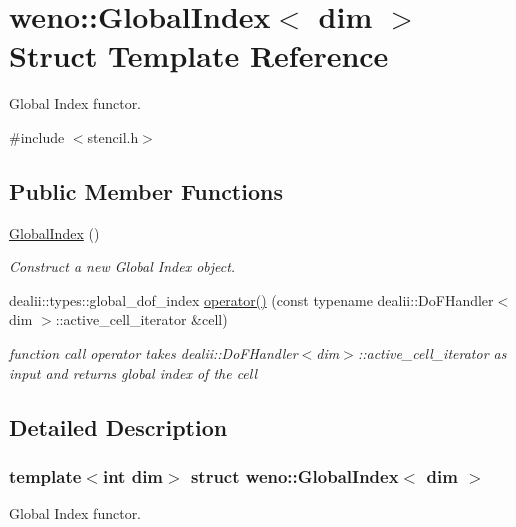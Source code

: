 \hypertarget{structweno_1_1_global_index}{}\section{weno\+:\+:Global\+Index$<$ dim $>$ Struct Template Reference}
\label{structweno_1_1_global_index}


Global Index functor.  




{\ttfamily \#include $<$stencil.\+h$>$}

\subsection*{Public Member Functions}
\begin{DoxyCompactItemize}
\item 
\hyperlink{structweno_1_1_global_index_a49ed88c4dfeace6963df58483f1e0108}{Global\+Index} ()
\begin{DoxyCompactList}\small\item\em Construct a new Global Index object. \end{DoxyCompactList}\item 
dealii\+::types\+::global\+\_\+dof\+\_\+index \hyperlink{structweno_1_1_global_index_ad15a44ee69c4c7e8d786fbb2cb8f56ab}{operator()} (const typename dealii\+::\+Do\+F\+Handler$<$ dim $>$\+::active\+\_\+cell\+\_\+iterator \&cell)
\begin{DoxyCompactList}\small\item\em function call operator takes dealii\+::\+Do\+F\+Handler$<$dim$>$\+::active\+\_\+cell\+\_\+iterator as input and returns global index of the cell \end{DoxyCompactList}\end{DoxyCompactItemize}


\subsection{Detailed Description}
\subsubsection*{template$<$int dim$>$\newline
struct weno\+::\+Global\+Index$<$ dim $>$}

Global Index functor. 






